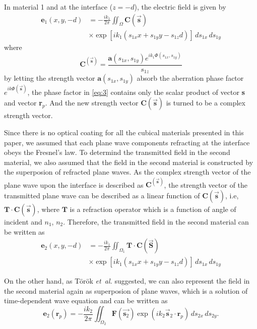 \documentclass[9pt,twocolumn,twoside]{osajnl}
\begin{document}
In material 1 and at the interface ($z=-d$), the electric field is given by
\begin{equation}\label{eq:3}
	\begin{aligned}
		\textbf{e}_1(x,y,-d)&=-\frac{ik_1}{2\pi}\iint_\Omega\textbf{C}(\vec{\mathbf{s}})\\
	&\times\exp[ik_1(s_{1x}x+s_{1y}y-s_{1z}d)]\,ds_{1x}\,ds_{1y}	
	\end{aligned}
\end{equation}
where 
\begin{equation}
	\textbf{C}^(\vec{\mathbf{s}})=\frac{\textbf{a}(s_{1x},s_{1y})e^{ik_1\Phi(s_{1x},s_{1y})}}{s_{1z}}
\end{equation}\label{eq:4}
by letting the strength vector $\mathbf{a}(s_{1x},s_{1y})$ absorb the aberration phase factor $e^{ik\Phi(\vec{\mathbf{s}})}$, the phase factor in \eqref{eq:3} contains only the scalar product of vector \textbf{s} and vector \textbf{r}$_p$. And the new strength vector $\textbf{C}(\vec{\mathbf{s}})$ is turned to be a complex strength vector.

Since there is no optical coating for all the cubical materials presented in this paper, we assumed that each plane wave components refracting at the interface obeys the Fresnel's law. To determind the transmitted field in the second material, we also assumed that the field in the second material is constructed by the superposion of refracted plane waves. As the complex strength vector of the plane wave upon the interface is described as $\textbf{C}^(\vec{\textbf{s}})$, the strength vector of the transmitted plane wave can be described as a linear function of $\textbf{C}(\vec{\textbf{s}})$, i.e, $\textbf{T}\cdot\textbf{C}(\vec{\textbf{s}})$, where $\mathbf{T}$ is a refraction operator which is a function of angle of incident and $n_1$, $n_2$. Therefore, the transmitted field in the second material can be written as
\begin{equation}\label{eq:5}
	\begin{aligned}
		\textbf{e}_2(x,y,-d)&=-\frac{ik_1}{2\pi}\iint_{\Omega_1}\textbf{T}\cdot\textbf{C}(\vec{\textbf{S}})\\
		&\times\exp[ik_1(s_{1x}x+s_{1y}y-s_{1z}d)]\,ds_{1x}\,ds_{1y}		
	\end{aligned}
\end{equation}

On the other hand, as T\"or\"ok \emph{et~al.} \cite{torok1995electromagnetic} suggested, we can also represent the field in the second material again as superposion of plane waves, which is a solution of time-dependent wave equation and can be written as
\begin{equation}\label{eq:6}
	\textbf{e}_2(\textbf{r}_p)=-\frac{ik_2}{2\pi}\iint_{\Omega_2}\textbf{F}(\vec{\mathbf{s}_2})\exp(ik_2\vec{\textbf{s}}_2\cdot\mathbf{r}_p)\,ds_{2x}\,ds_{2y}.
\end{equation}
\end{document}
